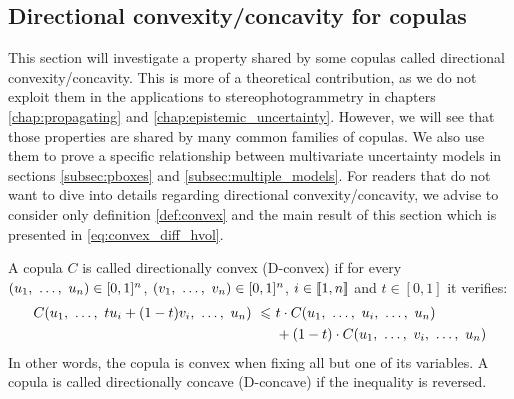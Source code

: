 \subsection{Directional convexity/concavity for copulas}\label{sec:dconvexity}
This section will investigate a property shared by some copulas called directional convexity/concavity. This is more of a theoretical contribution, as we do not exploit them in the applications to stereophotogrammetry in chapters \ref{chap:propagating} and \ref{chap:epistemic_uncertainty}. However, we will see that those properties are shared by many common families of copulas. We also use them to prove a specific relationship between multivariate uncertainty models in sections \ref{subsec:pboxes} and \ref{subsec:multiple_models}. For readers that do not want to dive into details regarding directional convexity/concavity, we advise to consider only definition \ref{def:convex} and the main result of this section which is presented in \cref{eq:convex_diff_hvol}.

\begin{definition}\label{def:convex}
    A copula $C$ is called directionally convex (D-convex) \cite{alvoni_dierent_2007} if for every $(u_1 , ~\dots, ~ u_n)\in[0,1]^n$, $(v_1, ~\dots, ~ v_n)\in[0,1]^n$, $i\in[\![1,n]\!]$ and $t\in[0,1]$ it verifies:
    \begin{align}
        C(u_1, ~\dots, ~ tu_i+(1-t)v_i, ~\dots, ~ u_n) ~\leqslant~&t\cdot C(u_1, ~\dots, ~ u_i, ~\dots, ~ u_n)\nonumber\\
        &+ (1-t)\cdot C(u_1, ~\dots, ~ v_i, ~\dots, ~ u_n)\label{eq:convex_copula}
    \end{align}
    In other words, the copula is convex when fixing all but one of its variables. A copula is called directionally concave (D-concave) if the inequality is reversed.
\end{definition}

